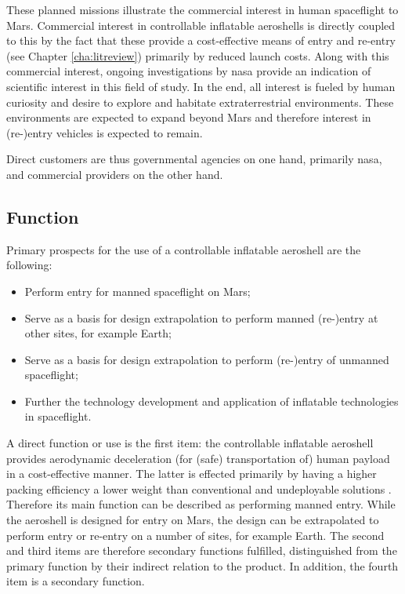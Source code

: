 These planned missions illustrate the commercial interest in human spaceflight to Mars. Commercial interest in controllable inflatable aeroshells is directly coupled to this by the fact that these provide a cost-effective means of entry and re-entry (see Chapter \ref{cha:litreview}) primarily by reduced launch costs. Along with this commercial interest, ongoing investigations by \gls{nasa} provide an indication of scientific interest in this field of study. In the end, all interest is fueled by human curiosity and desire to explore and habitate extraterrestrial environments. These environments are expected to expand beyond Mars and therefore interest in (re-)entry vehicles is expected to remain.

Direct customers are thus governmental agencies on one hand, primarily \gls{nasa}, and commercial providers on the other hand. 

\subsection{Function}
Primary prospects for the use of a controllable inflatable aeroshell are the following:
\begin{itemize}
\item Perform entry for manned spaceflight on Mars;
\item Serve as a basis for design extrapolation to perform manned (re-)entry at other sites, for example Earth;
\item Serve as a basis for design extrapolation to perform (re-)entry of unmanned spaceflight;
\item Further the technology development and application of inflatable technologies in spaceflight.
\end{itemize}
A direct function or use is the first item: the controllable inflatable aeroshell provides aerodynamic deceleration (for (safe) transportation of) human payload in a cost-effective manner. The latter is effected primarily by having a higher packing efficiency a lower weight than conventional and undeployable solutions \cite{Hughes2005, Cianciolo2010}. Therefore its main function can be described as performing manned entry. While the aeroshell is designed for entry on Mars, the design can be extrapolated to perform entry or re-entry on a number of sites, for example Earth. The second and third items are therefore secondary functions fulfilled, distinguished from the primary function by their indirect relation to the product. In addition, the fourth item is a secondary function.

